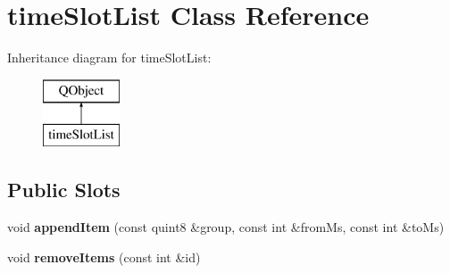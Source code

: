 \hypertarget{classtime_slot_list}{}\section{time\+Slot\+List Class Reference}
\label{classtime_slot_list}
Inheritance diagram for time\+Slot\+List\+:\begin{figure}[H]
\begin{center}
\leavevmode
\includegraphics[height=2.000000cm]{classtime_slot_list}
\end{center}
\end{figure}
\subsection*{Public Slots}
\begin{DoxyCompactItemize}
\item 
\mbox{\label{classtime_slot_list_a6f8f70ee657d26a777f278d778ba4175}} 
void {\bfseries append\+Item} (const quint8 \&group, const int \&from\+Ms, const int \&to\+Ms)
\item 
\mbox{\label{classtime_slot_list_aff5f7a216fd8e4d2a17066c4ba42093d}} 
void {\bfseries remove\+Items} (const int \&id)
\end{DoxyCompactItemize}
